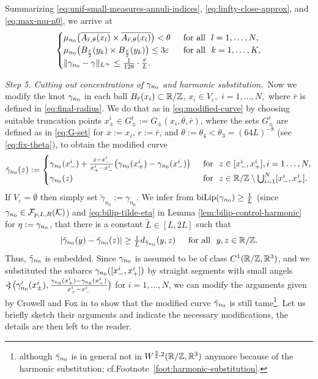 Summarizing \eqref{eq:unif-small-measures-annuli-indices},
\eqref{eq:linfty-close-approx}, and \eqref{eq:max-mu-n0},
we arrive at
\begin{equation}\label{eq:summary-n0}
\textstyle
\begin{cases}
\mu_{n_0}\big(\overline{A_{\bar{r},\theta}(x_l)}\times
\overline{A_{\bar{r},\theta}(x_l)}\big)<\theta & \,\,\,\text{for all }\,\, l=1,\ldots,N,\\
\mu_{n_0}\big(B_{\frac{\bar{r}}2}(y_k)\times
B_{\frac{\bar{r}}2}(y_k)\big)\le 3\varepsilon &\,\,\,\text{for all }\,\, k=1,\ldots,K,\\
\|\gamma_{n_0}-\gamma\|_{L^\infty} \le \frac1{128}\cdot\frac{\bar{r}}L.
\end{cases}
\end{equation}

{\it Step 5. Cutting out concentrations of $\gamma_{n_0}$ and harmonic 
substitution.}\,
Now we modify the knot
$\gamma_{n_0}$ in each ball $B_{\bar{r}}(x_i)\subset\mathbb{R}/\mathbb{Z}$, $x_i\in
V_\varepsilon,$ $i=1,\ldots,N,$ where $\bar{r}$ is defined in 
\eqref{eq:final-radius}. We do that as in \eqref{eq:modified-curve}
by choosing suitable truncation points $x_\pm^i\in G_\pm^i:=
G_\pm(x_i,\theta,\bar{r})$, where the sets $G_\pm^i$ are defined
as in \eqref{eq:G-set} for $x:=x_i$, $r:=\bar{r}$, and
$\theta:=\theta_4<\theta_3=(64L)^{-8}$ (see  \eqref{eq:fix-theta}),
to obtain the modified curve
\begin{equation}\label{eq:gamma-n0-modified}
\tilde{\gamma}_{n_0}(z):=\begin{cases}
\gamma_{n_0}(x_-^i)+\frac{z-x_-^i}{x_+^i-x_-^i}\big(\gamma_{n_0}(x_+^i)
-\gamma_{n_0}(x_-^i)\big) & \,\,\,\text{for }\,\,
z\in [x_-^i,x_+^i], i=1\ldots,N,\\
\gamma_{n_0}(z) & \,\,\,\text{for }\,\, z\in\mathbb{R}/\mathbb{Z}\setminus\bigcup_{i=1}^N[x_-^i,x_+^i].
\end{cases}
\end{equation}
If $V_\varepsilon=\emptyset$ then simply set $\tilde{\gamma}_{n_0}:=
\gamma_{n_0}$. We infer from $\operatorname{biLip}(\gamma_{n_0})\ge\frac1{L}$ 
(since $\gamma_{n_0}\in\mathcal{F}_{p,L,R}(\mathcal{K})$)
and
\eqref{eq:bilip-tilde-eta} in
Lemma \ref{lem:bilip-control-harmonic} for $\eta:=\gamma_{n_0}$,
that there is a constant $\tilde{L}\in [L,2L]$ such that
\begin{equation}\label{eq:bilip-tildegamma}
\textstyle
|\tilde{\gamma}_{n_0}(y)-\tilde{\gamma}_{n_0}(z)|\ge
\frac1{\tilde{L}}d_{\tilde{\gamma}_{n_0}}(y,z)
\quad\,\,\,\text{for all }\,\, y,z\in\mathbb{R}/\mathbb{Z}.
\end{equation}
Thus, $\tilde{\gamma}_{n_0}$ is embedded. Since $\gamma_{n_0}$ is assumed to be
of class $C^1(\mathbb{R}/\mathbb{Z},\mathbb{R}^3)$, and we substituted the subarcs 
$\gamma_{n_0}([x_-^i,x_+^i])$ by straight segments with small
angels 
$\mathop{\mbox{$<\!\!\!)$}}\nolimits\big(\gamma_{n_0}'(x_\pm^i),\frac{\gamma_{n_0}(x_+^i)-\gamma_{n_0}(x_-^i)}{
x_+^i-x_-^i}\big)$ for $i=1,\ldots,N$, we can modify the
arguments given by Crowell and Fox
in \cite[Appendix~I]{crowell-fox_1977} to show that 
the modified curve $\tilde{\gamma}_{n_0}$ is still tame\footnote{although 
$\tilde{\gamma}_{n_0}$ is in general not in $W^{\frac32,2}(\mathbb{R}/\mathbb{Z},\mathbb{R}^3)$ 
anymore because of the harmonic substitution; 
cf.\@ Footnote~\ref{foot:harmonic-substitution}.}.
Let us briefly sketch their arguments and indicate the necessary
modifications, the details are then left to the reader.

